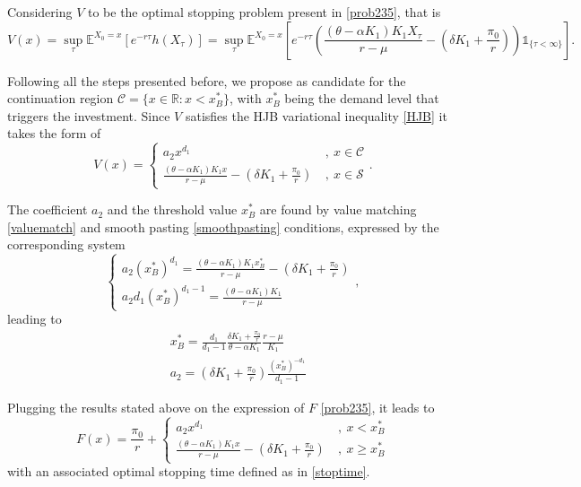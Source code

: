 Considering $V$ to be the optimal stopping problem present in \eqref{prob235}, that is
\begin{equation}
V(x)=  \sup _\tau \mathds{E}^{X_0=x} \left[ e^{-r\tau}h(X_\tau) \right] 
=\sup _\tau \mathds{E}^{X_0=x} \left[ e^{-r\tau}\left(\frac{(\theta-\alpha K_1)K_1 X_\tau}{r-\mu} - \left( \delta K_1  +\frac{\pi_0}{r}\right)  \right) \mathds{1}_{ \{\tau < \infty \} }\right].
\end{equation} 

Following all the steps presented before, we propose as candidate for the continuation region $\mathcal{C}=\{x \in \mathds{R}: x<x_B^* \}$, with $x^*_B$ being the demand level that triggers the investment. Since $V$ satisfies the HJB variational inequality \eqref{HJB} it takes the form of
\begin{equation}
V(x)=\begin{cases} a_2 x^{d_1} &\ , \ x \in \mathcal{C} \\
\frac{(\theta-\alpha K_1)K_1 x}{r-\mu} - \left( \delta K_1  +\frac{\pi_0}{r}\right) &\ , \ x \in \mathcal{S}
\end{cases}.
\end{equation}

The coefficient $a_2$ and the threshold value $x_B^*$ are found by value matching \eqref{valuematch} and smooth pasting \eqref{smoothpasting} conditions, expressed by the corresponding system
\begin{equation}
\begin{cases} a_2(x_B^*)^{d_1}=\frac{(\theta-\alpha K_1)K_1 x_B^*}{r-\mu} - \left( \delta K_1  +\frac{\pi_0}{r}\right) \\
a_2d_1(x_B^*)^{d_1-1}=\frac{(\theta-\alpha K_1)K_1}{r-\mu}
\end{cases},
\label{eq:sistema2}
\end{equation}
leading to
\begin{align}
&x_B^*=\frac{d_1}{d_1-1} \frac{ \delta K_1  +\frac{\pi_0}{r} }{\theta-\alpha K_1} \frac{r-\mu}{K_1} \label{2_xB} \\
&a_2=\left( \delta K_1 +\frac{\pi_0}{r}\right) \frac{(x_B^*)^{-d_1}}{d_1-1} \label{2_aB}
\end{align}


Plugging the results stated above on the expression of $F$ \eqref{prob235}, it leads to
\begin{equation}
F(x)=\frac{\pi_0}{r}+\begin{cases} a_2 x^{d_1} &\ , \ x<x^*_B \\
\frac{(\theta-\alpha K_1)K_1 x}{r-\mu} - \left( \delta K_1  +\frac{\pi_0}{r}\right) &\ , \ x\geq x_B^*
\label{2:Fbm}
\end{cases}
\end{equation}
with an associated optimal stopping time defined as in \eqref{stoptime}.




